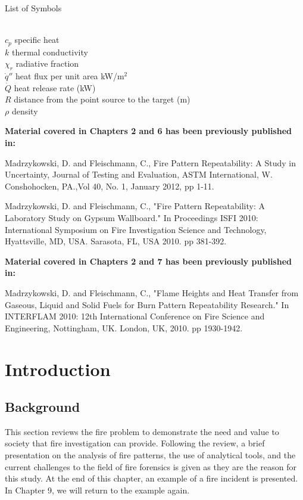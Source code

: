 \documentclass[twoside]{uocthesis}
\begin{document}
\clearpage

List of Symbols
\begin{tabbing}
\hspace{1.5in} \= \\
$c_{p}$ \> specific heat \\
$k$ \> thermal conductivity \\
$\chi_r$ \> radiative fraction \\
$\dot{q}''$ \> heat flux per unit area kW/m$^2$ \\
$\dot{Q}$ \> heat release rate (kW) \\ 
$R$ \> distance from the point source to the target (m) \\
$\rho$ \> density \\
\end{tabbing}


\textbf{Material covered in Chapters 2 and 6 has been previously published in:}   

Madrzykowski, D. and Fleischmann, C., Fire Pattern Repeatability: A Study in Uncertainty, Journal of
Testing and Evaluation, ASTM International, W. Conshohocken, PA.,Vol 40, No. 1, January 2012, pp 1-11.

Madrzykowski, D. and Fleischmann, C., "Fire Pattern Repeatability: A Laboratory Study on Gypsum Wallboard." In Proceedings ISFI 2010: International Symposium on Fire Investigation Science and Technology, Hyattsville, MD, USA. Sarasota, FL, USA 2010. pp 381-392.

\textbf{Material covered in Chapters 2 and 7 has been previously published in:} 

Madrzykowski, D. and Fleischmann, C., "Flame Heights and Heat Transfer from Gaseous, Liquid and Solid Fuels for Burn Pattern Repeatability Research." In INTERFLAM 2010: 12th International Conference on Fire Science and Engineering, Nottingham, UK. London, UK, 2010. pp 1930-1942.



\textpages

\chapter{Introduction}
\label{chapter:Introduction}
\section{Background}

This section reviews the fire problem to demonstrate the need and value to society that fire investigation can provide. Following the review, a brief presentation on the analysis  of fire patterns, the use of analytical tools, and the current challenges to the field of fire forensics is given as they are the reason for this study.  At the end of this chapter, an example of a fire incident is presented. In Chapter 9, we will return to the example again.   
\end{document}
